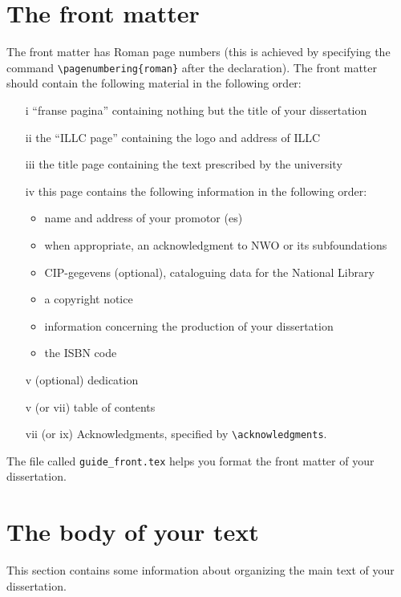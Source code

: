 \section{The front matter}
The front matter has Roman page numbers (this is achieved by
specifying the command \verb|\pagenumbering{roman}| after the 
\verb|| declaration). The front matter should contain 
the following material in the following order:
\begin{enumerate}
\item[i]
``franse pagina'' containing nothing but the title of your dissertation
\item[ii]
the ``ILLC page'' containing the logo and address of ILLC
\item[iii]
the title page containing the text prescribed by the university
\item[iv]
this page contains the following information in the following order:
	\begin{itemize}
	\item
	name and address of your promotor (es)
	\item
	when appropriate, an acknowledgment to NWO or its subfoundations
	\item
	CIP-gegevens (optional), cataloguing data for the National Library
	\item
	a copyright notice
	\item
	information concerning the production of your dissertation
	\item
	the ISBN code
	\end{itemize}
\item[v] (optional)
dedication
\item[v] (or vii)
table of contents
\item[vii] (or ix)
Acknowledgments, specified by \verb|\acknowledgments|.
\end{enumerate}
The file called  \verb|guide_front.tex| helps you format
the front matter of your dissertation.


\section{The body of your text}
This section contains some information about organizing the main
text of your dissertation.

